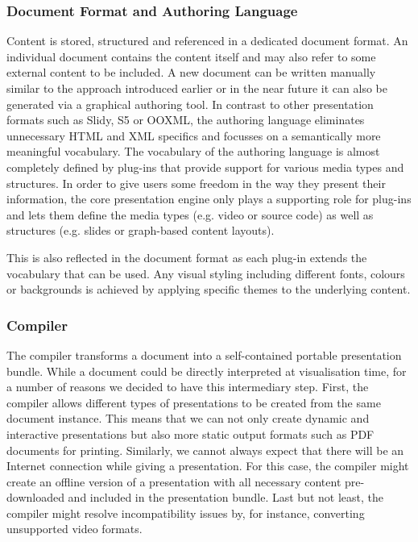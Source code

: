 \documentclass[a4paper,12pt]{report}
\begin{document}
    \subsubsection{Document Format and Authoring Language}

     Content is stored, structured and referenced in a dedicated \mxp document
     format. An individual \mxp document contains the content itself and may
     also refer to some external content to be included. A new \mxp document
     can be written manually similar to the \latex approach introduced earlier
     or in the near future it can also be generated via a graphical authoring
     tool. In contrast to other presentation formats such as Slidy, S5 or
     OOXML, the authoring language eliminates unnecessary HTML and XML
     specifics and focusses on a semantically more meaningful vocabulary. The
     vocabulary of the authoring language is almost completely defined by
     plug-ins that provide support for various media types and structures. In
     order to give users some freedom in the way they present their
     information, the core \mxp presentation engine only plays a supporting
     role for plug-ins and lets them define the media types (e.g. video or
     source code) as well as structures (e.g. slides or graph-based content
     layouts).

     This is also reflected in the document format as each plug-in extends the
     vocabulary that can be used. Any visual styling including different fonts,
     colours or backgrounds is achieved by applying specific themes to the
     underlying content.

    \subsubsection{Compiler}

     The compiler transforms a \mxp document into a self-contained portable
     \mxp presentation bundle. While a \mxp document could be directly interpreted
     at visualisation time, for a number of reasons we decided to have this
     intermediary step. First, the compiler allows different types of presentations
     to be created from the same \mxp document instance. This means that we can not
     only create dynamic and interactive presentations but also more static output
     formats such as PDF documents for printing. Similarly, we cannot always expect
     that there will be an Internet connection while giving a presentation. For this
     case, the compiler might create an offline version of a presentation with all
     necessary content pre-downloaded and included in the \mxp presentation bundle.
     Last but not least, the compiler might resolve incompatibility issues by, for
     instance, converting unsupported video formats.
\end{document}
